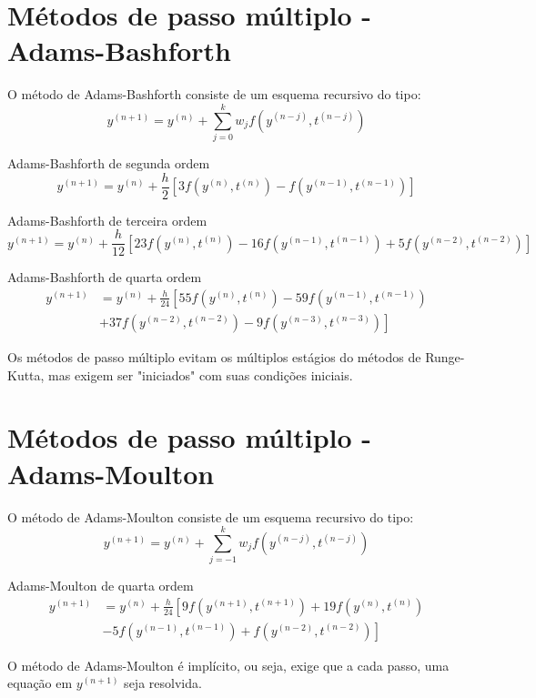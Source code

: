 \section{Métodos de passo múltiplo - Adams-Bashforth}

O método de Adams-Bashforth consiste de um esquema recursivo do tipo:
$$y^{(n+1)}=y^{(n)}+\sum_{j=0}^k w_jf(y^{(n-j)},t^{(n-j)})$$

\begin{ex} Adams-Bashforth de segunda ordem
$$y^{(n+1)}=y^{(n)}+\frac{h}{2}\left[3f\left(y^{(n)},t^{(n)}\right)-f\left(y^{(n-1)},t^{(n-1)}\right)\right]$$
\end{ex}

\begin{ex} Adams-Bashforth de terceira ordem
$$y^{(n+1)}=y^{(n)}+\frac{h}{12}\left[23f\left(y^{(n)},t^{(n)}\right)-16f\left(y^{(n-1)},t^{(n-1)}\right)+5f\left(y^{(n-2)},t^{(n-2)}\right)\right]$$
\end{ex}

\begin{ex} Adams-Bashforth de quarta ordem
  \begin{equation*}
    \begin{split}
      y^{(n+1)} &= y^{(n)} + \frac{h}{24}\left[55f\left(y^{(n)},t^{(n)}\right)-59f\left(y^{(n-1)},t^{(n-1)}\right)\right.\\
        &+\left. 37f\left(y^{(n-2)},t^{(n-2)}\right)-9f\left(y^{(n-3)},t^{(n-3)}\right)\right]    
    \end{split}
  \end{equation*}
\end{ex}
Os métodos de passo múltiplo evitam os múltiplos estágios do métodos de Runge-Kutta, mas exigem ser "iniciados" com suas condições iniciais.

\section{Métodos de passo múltiplo - Adams-Moulton}

O método de Adams-Moulton consiste de um esquema recursivo do tipo:
$$y^{(n+1)}=y^{(n)}+\sum_{j=-1}^k w_jf(y^{(n-j)},t^{(n-j)})$$

\begin{ex} Adams-Moulton de quarta ordem
  \begin{equation*}
    \begin{split}
      y^{(n+1)} &= y^{(n)} + \frac{h}{24}\left[9f\left(y^{(n+1)},t^{(n+1)}\right) + 19f\left(y^{(n)},t^{(n)}\right) \right.\\
      &-\left. 5f\left(y^{(n-1)},t^{(n-1)}\right) + f\left(y^{(n-2)},t^{(n-2)}\right)\right]      
    \end{split}
  \end{equation*}
\end{ex}
O método de Adams-Moulton é implícito, ou seja, exige que a cada passo, uma equação em $y^{(n+1)}$ seja resolvida.


